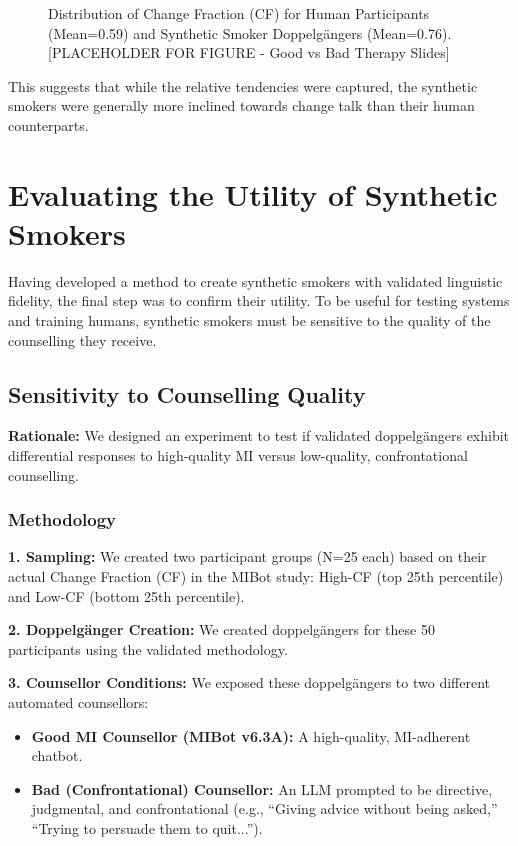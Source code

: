\begin{figure}[ht]
    \centering
    \caption{Distribution of Change Fraction (CF) for Human Participants (Mean=0.59) and Synthetic Smoker Doppelgängers (Mean=0.76). [PLACEHOLDER FOR FIGURE - Good vs Bad Therapy Slides]}
    \label{fig:cf-distribution}
\end{figure}

This suggests that while the relative tendencies were captured, the synthetic smokers were generally more inclined towards change talk than their human counterparts.

\section{Evaluating the Utility of Synthetic Smokers}
\label{sec:synthetic-smoker-utility}

Having developed a method to create synthetic smokers with validated linguistic fidelity, the final step was to confirm their utility. To be useful for testing systems and training humans, synthetic smokers must be sensitive to the quality of the counselling they receive.

\subsection{Sensitivity to Counselling Quality}

\textbf{Rationale:} We designed an experiment to test if validated doppelgängers exhibit differential responses to high-quality MI versus low-quality, confrontational counselling.

\subsubsection{Methodology}

\textbf{1. Sampling:} We created two participant groups (N=25 each) based on their actual Change Fraction (CF) in the MIBot study: High-CF (top 25th percentile) and Low-CF (bottom 25th percentile).

\textbf{2. Doppelgänger Creation:} We created doppelgängers for these 50 participants using the validated methodology.

\textbf{3. Counsellor Conditions:} We exposed these doppelgängers to two different automated counsellors:
\begin{itemize}
    \item \textbf{Good MI Counsellor (MIBot v6.3A):} A high-quality, MI-adherent chatbot.
    \item \textbf{Bad (Confrontational) Counsellor:} An LLM prompted to be directive, judgmental, and confrontational (e.g., ``Giving advice without being asked,'' ``Trying to persuade them to quit...'').
\end{itemize}

